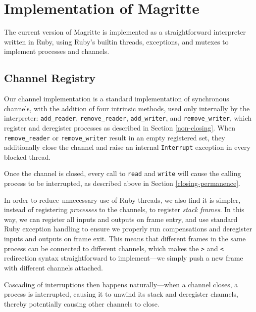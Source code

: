 \documentclass[english,PRO]{ipsj}
\begin{document}
\section{Implementation of Magritte}\label{implementation}

\noindent
The current version of Magritte is implemented as a straightforward interpreter written in Ruby, using Ruby's builtin threads, exceptions, and mutexes to implement processes and channels.

\subsection{Channel Registry}\noindent
Our channel implementation is a standard implementation of synchronous channels, with the addition of four intrinsic methods, used only internally by the interpreter: \verb/add_reader/, \verb/remove_reader/, \verb/add_writer/, and \verb/remove_writer/, which register and deregister processes as described in Section \ref{non-closing}. When \verb/remove_reader/ or \verb/remove_writer/ result in an empty registered set, they additionally close the channel and raise an internal \verb/Interrupt/ exception in every blocked thread.

Once the channel is closed, every call to \verb/read/ and \verb/write/ will cause the calling process to be interrupted, as described above in Section \ref{closing-permanence}.

In order to reduce unnecessary use of Ruby threads, we also find it is simpler, instead of registering \emph{processes} to the channels, to register \emph{stack frames}. In this way, we can register all inputs and outputs on frame entry, and use standard Ruby exception handling to ensure we properly run compensations and deregister inputs and outputs on frame exit. This means that different frames in the same process can be connected to different channels, which makes the \verb/>/ and \verb/</ redirection syntax straightforward to implement---we simply push a new frame with different channels attached.

Cascading of interruptions then happens naturally---when a channel closes, a process is interrupted, causing it to unwind its stack and deregister channels, thereby potentially causing other channels to close.
\end{document}

